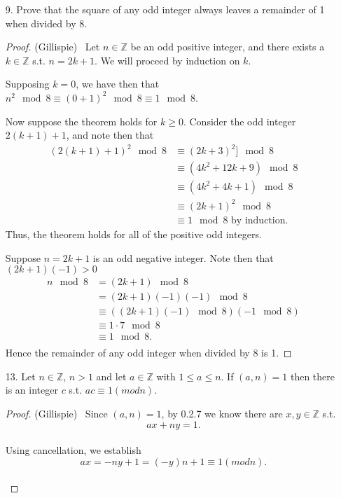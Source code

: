 \documentclass[10pt]{article}
\newcommand{\Z}{\mathbb{Z}}
\begin{document}
\begin{itemize}

\item[9.]  Prove that the square of any odd integer always leaves a remainder of 1 when divided by 8.

\begin{proof} (Gillispie) \  Let $ n \in \Z $ be an odd positive integer, and there exists a $k \in \Z$ s.t. $ n = 2k + 1$. We will proceed by induction on $k$. 

Supposing $k=0$, we have then that $n^2\mod 8 \equiv (0+1)^2\mod 8 \equiv 1\mod 8$.

Now suppose the theorem holds for $k \ge 0$.
Consider the odd integer $2(k+1)+1$, and note then that 
\begin{align*}
(2(k+1)+1)^2 \mod8 &\equiv (2k+3)^2] \mod 8\\
 &\equiv (4k^2 + 12k + 9) \mod 8\\
 &\equiv (4k^2 +4k + 1) \mod 8\\
 &\equiv {(2k+1)}^2 \mod 8\\
 &\equiv 1 \mod 8 \text{ by induction.}
 \end{align*}
 Thus, the theorem holds for all of the positive odd integers.

Suppose $n=2k+1$ is an odd negative integer. Note then that $(2k+1)(-1)>0$
\begin{align*}
n \mod 8 &= (2k+1 )\mod 8\\
          &= (2k+1)(-1)(-1) \mod 8\\
          &\equiv ((2k+1)(-1) \mod 8)(-1 \mod 8)\\
          &\equiv 1\cdot7 \mod 8\\
          &\equiv 1 \mod 8.\\
\end{align*}
Hence the remainder of any odd integer when divided by 8 is 1.

\end{proof}

\item[13.] Let $n\in\Z$, $n>1$ and let $a\in \Z$ with $1\le a \le n$. If $(a,n)=1$ then there is an integer $c$ s.t. $ac \equiv 1 (mod n)$.

 \begin{proof} (Gillispie) \ Since $(a,n)=1$, by 0.2.7 we know there are $x,y\in\Z$ s.t. \[ax + ny =1.\]\\
 Using cancellation, we establish \[ax= -ny +1=(-y)n+1 \equiv 1 (mod n).\]\\

 \end{proof}

\end{itemize}
\end{document}
